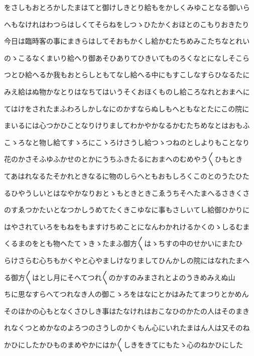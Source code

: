 \documentclass[a4paper,11pt,landscape]{ltjtarticle}
\begin{document}
\par\medskip
をさしもおとろかしたまはてと御けしきとり給もをかしくみゆことなる御いら
\par\medskip
へもなけれはわつらはしくてそらねをしつゝひたかくおほとのこもりおきたり
\par\medskip
今日は臨時客の事にまきらはしてそおもかくし給かむたちめみこたちなとれい
\par\medskip
のゝこるなくまいり給へり御あそひありてひきいてものろくなとになしそこら
\par\medskip
つとひ給へるか我もおとらしともてなし給へる中にもすこしなすらひなるたに
\par\medskip
みえ給はぬ物かなとりはなちてはいうそくおほくものし給ころなれとおまへに
\par\medskip
てはけをされたまふわろしかしなにのかすならぬしもへともなとたにこの院に
\par\medskip
まいるには心つかひことなりけりましてわかやかなるかむたちめなとはおもふ
\par\medskip
こゝろなと物し給てすゝろにこゝろけさうし給つゝつねのとしよりもことなり
\par\medskip
花のかさそふゆふかせのとかにうちふきたるにおまへのむめやう〱ひもとき
\par\medskip
てあはれなるたそかれときなるに物のしらへともおもしろくこのとのうたひた
\par\medskip
るひやうしいとはなやかなりおとゝもときときこゑうちそへたまへるさきくさ
\par\medskip
のすゑつかたいとなつかしうめてたくきこゆなに事もさしいてし給御ひかりに
\par\medskip
はやされていろをもねをもますけちめことになんわかれけるかくのゝしるむま
\par\medskip
くるまのをとも物へたてゝきゝたまふ御方〱はゝちすの中のせかいにまたひ
\par\medskip
らけさらむ心ちもかくやと心やましけなりましてひんかしの院にはなれたまへ
\par\medskip
る御方〱はとし月にそへてつれ〱のかすのみまされとよのうきめみえぬ山
\par\medskip
ちに思なすらへてつれなき人の御こゝろをはなにとかはみたてまつりとかめん
\par\medskip
そのほかの心もとなくさひしき事はたなけれはおこなひのかたの人はそのまき
\par\medskip
れなくつとめかなのよろつのさうしのかくもん心にいれたまはん人は又そのね
\par\medskip
かひにしたかひものまめやかにはか〱しきをきてにもたゝ心のねかひにした
\par\medskip
\end{document}
